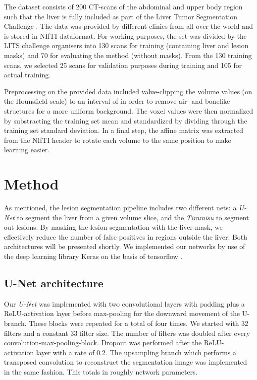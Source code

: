 \documentclass{article}
\begin{document}
The dataset consists of 200 CT-scans
of the abdominal and upper body region such that the liver is fully included as part of the Liver Tumor Segmentation Challenge \cite{litsnew}.
The data was provided by different clinics from all over the world
and is stored in NIfTI dataformat.
For working purposes, the set was divided by the LITS challenge organisers
into 130 scans for training (containing liver and lesion masks)
and 70 for evaluating the method (without masks).
From the 130 training scans, we selected 25 scans for validation purposes during
training and 105 for actual training.


Preprocessing on the provided data included value-clipping the volume values (on the Hounsfield scale) to an interval of  in order to remove air- and bonelike structures for a more uniform background. The voxel values were then normalized by substracting the training set mean and standardized by dividing through the training set standard deviation. In a final step, the affine matrix was extracted from the NIfTI header to rotate each volume to the same position to make learning easier.



\section{Method}
\label{sec:method}

As mentioned, the lesion segmentation pipeline includes two different nets:
a \textit{U-Net} to segment the liver from a given volume slice,
and the \textit{Tiramisu} to segment out lesions.
By masking the lesion segmentation with the liver mask, we effectively reduce the number of false positives in regions outside the liver.
Both architectures will be presented shortly.
We implemented our networks by use of the deep learning library Keras \cite{KERAS} on the basis of tensorflow \cite{tensorflow}.


\subsection{U-Net architecture}
Our \textit{U-Net} was implemented with two convolutional layers with padding plus a ReLU-activation layer
before max-pooling for the downward movement of the U-branch.
These blocks were repeated for a total of four times.
We started with 32 filters and a constant 33 filter size.
The number of filters was doubled after every convolution-max-pooling-block.
Dropout was performed after the ReLU-activation layer with a rate of 0.2.
The upsampling branch which performs a transposed convolution to reconstruct
the segmentation image was implemented in the same fashion. This totals in roughly  network parameters.
\end{document}
